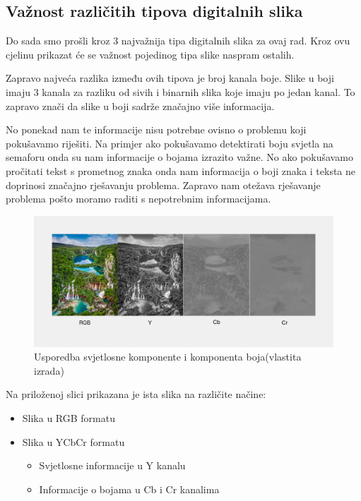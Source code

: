 \documentclass{foi}
\begin{document}
\subsection{Važnost različitih tipova digitalnih slika}

Do sada smo prošli kroz 3 najvažnija tipa digitalnih slika za ovaj rad. Kroz ovu cjelinu prikazat će se važnost pojedinog tipa slike naspram ostalih.

Zapravo najveća razlika između ovih tipova je broj kanala boje. Slike u boji imaju 3 kanala za razliku od sivih i binarnih slika koje imaju po jedan kanal. To zapravo znači da slike u boji sadrže značajno više informacija. 

No ponekad nam te informacije nisu potrebne ovisno o problemu koji pokušavamo riješiti. Na primjer ako pokušavamo detektirati boju svjetla na semaforu onda su nam informacije o bojama izrazito važne. No ako pokušavamo pročitati tekst s prometnog znaka onda nam informacija o boji znaka i teksta ne doprinosi značajno rješavanju problema. Zapravo nam otežava rješavanje problema pošto moramo raditi s nepotrebnim informacijama.

\begin{figure}[H]
    \centering
    \includegraphics[width=1.0\linewidth]{slike/Luminace vs chrominance.png}
    \caption{Usporedba svjetlosne komponente i komponenta boja(vlastita izrada)}
\end{figure}

\begin{flushleft}
    Na priloženoj slici prikazana je ista slika na različite načine:
    \begin{itemize}[label=•]
        \item Slika u RGB formatu
        \item Slika u YCbCr formatu
        \begin{itemize}[label=•]
            \item Svjetlosne informacije u Y kanalu
            \item Informacije o bojama u Cb i Cr kanalima
        \end{itemize}
    \end{itemize}
    \end{flushleft}
\end{document}
